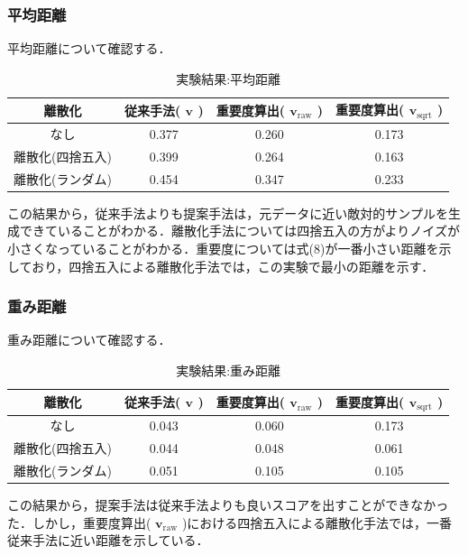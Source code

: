 \subsubsection{平均距離}
平均距離について確認する．
\begin{table}[H]
    \centering
    \caption{実験結果:平均距離}
    \begin{tabular}{|c|c|c|c|} \hline
        離散化 & 従来手法( $\bm{v}$ ) & 重要度算出( $\bm{v}_{\mathrm{raw}}$ ) & 重要度算出( $\bm{v}_{\mathrm{sqrt}}$ ) \\ \hline
        なし & 0.377 & 0.260 & 0.173 \\ \hline
        離散化(四捨五入) & 0.399 & 0.264 & 0.163 \\ \hline
        離散化(ランダム) & 0.454 & 0.347 & 0.233 \\ \hline
    \end{tabular}
\end{table}
この結果から，従来手法よりも提案手法は，元データに近い敵対的サンプルを生成できていることがわかる．離散化手法については四捨五入の方がよりノイズが小さくなっていることがわかる．重要度については式(8)が一番小さい距離を示しており，四捨五入による離散化手法では，この実験で最小の距離を示す．

\subsubsection{重み距離}
重み距離について確認する．
\begin{table}[H]
    \centering
    \caption{実験結果:重み距離}
    \begin{tabular}{|c|c|c|c|} \hline
        離散化 & 従来手法( $\bm{v}$ ) & 重要度算出( $\bm{v}_{\mathrm{raw}}$ ) & 重要度算出( $\bm{v}_{\mathrm{sqrt}}$ ) \\ \hline
        なし & 0.043 & 0.060 & 0.173\\ \hline
        離散化(四捨五入) & 0.044 & 0.048 & 0.061 \\ \hline
        離散化(ランダム) & 0.051 & 0.105 & 0.105 \\ \hline
    \end{tabular}
\end{table}
この結果から，提案手法は従来手法よりも良いスコアを出すことができなかった．しかし，重要度算出( $\bm{v}_{\mathrm{raw}}$ )における四捨五入による離散化手法では，一番従来手法に近い距離を示している．

